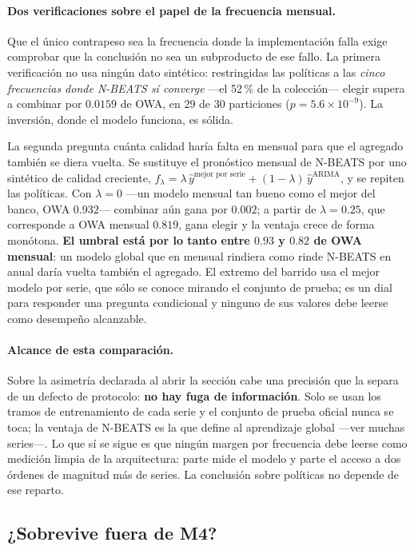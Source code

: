 \paragraph{Dos verificaciones sobre el papel de la frecuencia mensual.} Que el único
contrapeso sea la frecuencia donde la implementación falla exige comprobar que la
conclusión no sea un subproducto de ese fallo. La primera verificación no usa ningún dato
sintético: restringidas las políticas a las \emph{cinco frecuencias donde N-BEATS sí
converge} ---el 52\,\% de la colección--- elegir supera a combinar por $0.0159$ de OWA,
en 29 de 30 particiones ($p=5.6\times10^{-9}$). La inversión, donde el modelo funciona,
es sólida.

La segunda pregunta cuánta calidad haría falta en mensual para que el agregado también se
diera vuelta. Se sustituye el pronóstico mensual de N-BEATS por uno sintético de calidad
creciente, $f_\lambda = \lambda\,\hat{y}^{\text{mejor por serie}} + (1-\lambda)\,
\hat{y}^{\text{ARIMA}}$, y se repiten las políticas. Con $\lambda=0$ ---un modelo mensual
tan bueno como el mejor del banco, OWA $0.932$--- combinar aún gana por $0.002$; a partir
de $\lambda=0.25$, que corresponde a OWA mensual $0.819$, gana elegir y la ventaja crece
de forma monótona. \textbf{El umbral está por lo tanto entre $0.93$ y $0.82$ de OWA
mensual}: un modelo global que en mensual rindiera como rinde N-BEATS en anual daría
vuelta también el agregado. El extremo del barrido usa el mejor modelo por serie, que
sólo se conoce mirando el conjunto de prueba; es un dial para responder una pregunta
condicional y ninguno de sus valores debe leerse como desempeño alcanzable.

\paragraph{Alcance de esta comparación.} Sobre la asimetría declarada al abrir la sección
cabe una precisión que la separa de un defecto de protocolo: \textbf{no hay fuga de
información}. Solo se usan los tramos de entrenamiento de cada serie y el conjunto de
prueba oficial nunca se toca; la ventaja de N-BEATS es la que define al aprendizaje global
---ver muchas series---. Lo que sí se sigue es que ningún margen por frecuencia debe
leerse como medición limpia de la arquitectura: parte mide el modelo y parte el acceso a
dos órdenes de magnitud más de series. La conclusión sobre políticas no depende de ese
reparto.

\subsection{¿Sobrevive fuera de M4?}\label{sec:m3}

